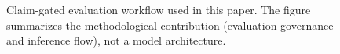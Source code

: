 \begin{figure}[t]
\centering
\setlength{\fboxsep}{6pt}
\caption{Claim-gated evaluation workflow used in this paper. The figure summarizes the methodological contribution (evaluation governance and inference flow), not a model architecture.}
\label{fig:claim-gated-pipeline}
\end{figure}
